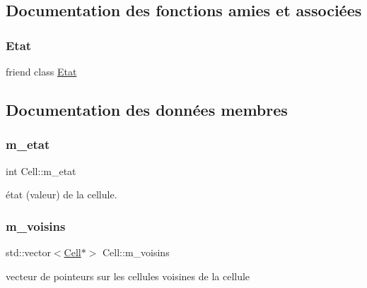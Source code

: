 \subsection{Documentation des fonctions amies et associées}
\mbox{\label{class_cell_af495e82aa15594b628d4192e8ecb688b}} 
\subsubsection{\texorpdfstring{Etat}{Etat}}
{\footnotesize\ttfamily friend class \mbox{\hyperlink{class_etat}{Etat}}\hspace{0.3cm}{\ttfamily [friend]}}



\subsection{Documentation des données membres}
\mbox{\label{class_cell_a350cfee41db7450651de4e48543227c3}} 
\subsubsection{\texorpdfstring{m\+\_\+etat}{m\_etat}}
{\footnotesize\ttfamily int Cell\+::m\+\_\+etat\hspace{0.3cm}{\ttfamily [private]}}



état (valeur) de la cellule. 

\mbox{\label{class_cell_a7d781cbf0f2a5dffd13313b8eab86732}} 
\subsubsection{\texorpdfstring{m\+\_\+voisins}{m\_voisins}}
{\footnotesize\ttfamily std\+::vector$<$\mbox{\hyperlink{class_cell}{Cell}}$\ast$$>$ Cell\+::m\+\_\+voisins\hspace{0.3cm}{\ttfamily [private]}}



vecteur de pointeurs sur les cellules voisines de la cellule 

\mbox{\label{class_cell_ae38c546e6fd703965c8b62f750e68417}} 
